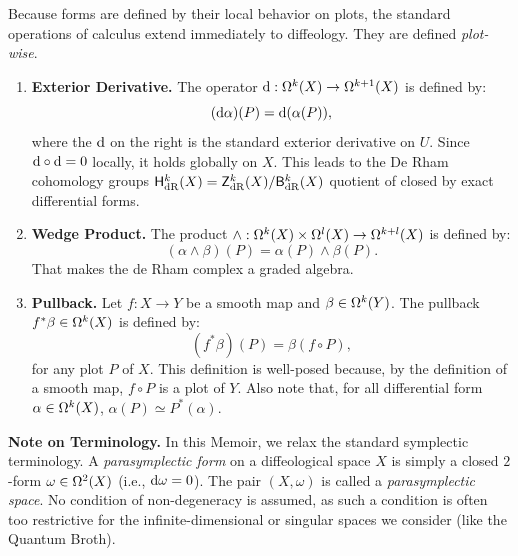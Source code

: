 \documentclass[10pt,reqno,letterpaper,twoside]{amsbook}
\begin{document}
  \begin{article}
    Because forms are defined by their local behavior on plots,
    the standard operations of calculus extend immediately to diffeology.
    They are defined \emph{plot-wise}.
    
    \begin{enumerate}
      \item \textbf{Exterior Derivative.}
      The operator $\mathrm{d}: \Omega^k(X) \to \Omega^{k+1}(X)$ is defined by:
      \[
        (\mathrm{d}\alpha)(P) = \mathrm{d}(\alpha(P)),
        \]
      where the $\mathrm{d}$ on the right is the standard exterior derivative on $U$.
      Since $\mathrm{d} \circ \mathrm{d} = 0$ locally,
      it holds globally on $X$.
      This leads to the De Rham cohomology groups $\mathsf{H}_\mathrm{dR}^k(X) = \mathsf{Z}_\mathrm{dR}^k(X) / \mathsf{B}_\mathrm{dR}^k(X)$
      quotient of closed by exact differential forms.
      
      \item \textbf{Wedge Product.}
      The product $\wedge: \Omega^k(X) \times \Omega^l(X) \to \Omega^{k+l}(X)$ is defined by:
      \[
        (\alpha \wedge \beta)(P) = \alpha(P) \wedge \beta(P).
        \]
      That makes the de Rham complex a graded algebra.
      
      \item \textbf{Pullback.}
      Let $f: X \to Y$ be a smooth map and $\beta \in \Omega^k(Y)$.
      The pullback $f^*\beta \in \Omega^k(X)$ is defined by:
      \[
        (f^*\beta)(P) = \beta(f \circ P),
        \]
      for any plot $P$ of $X$.
      This definition is well-posed because,
      by the definition of a smooth map,
      $f \circ P$ is a plot of $Y$.
      Also note that,
      for all differential form $\alpha \in \Omega^k(X)$,
      $\alpha(P) \simeq P^*(\alpha)$.
    \end{enumerate}
    
    \textbf{Note on Terminology.}
    In this Memoir,
    we relax the standard symplectic terminology.
    A \emph{parasymplectic form} on a diffeological space $X$ is simply a closed $2$-form $\omega \in \Omega^2(X)$ (i.e., $\mathrm{d}\omega = 0$).
    The pair $(X, \omega)$ is called a \emph{parasymplectic space}.
    No condition of non-degeneracy is assumed,
    as such a condition is often too restrictive for the infinite-dimensional or singular spaces we consider (like the Quantum Broth).
  \end{article}
  
\end{document}
